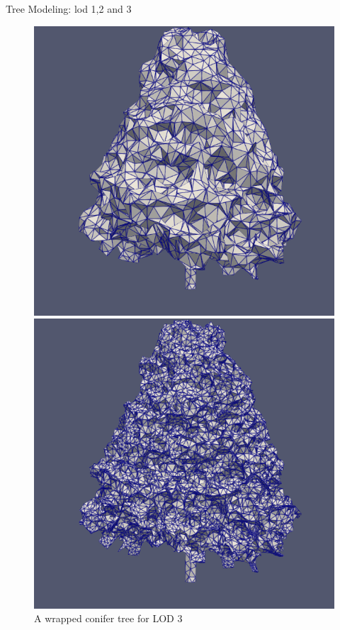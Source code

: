 \documentclass[10pt]{beamer}
\begin{document}
\begin{frame}{Tree Modeling: lod 1,2 and 3}
\begin{figure}[h]
\begin{minipage}{0.3\textwidth}
			\includegraphics[width=\textwidth]{images/tree-cone_lod2.png}
			\caption{A wrapped conifer tree for LOD 2}
			\label{fig:figure2}
		\end{minipage}
		\begin{minipage}{0.33\textwidth}
			\centering
			\includegraphics[width=\textwidth]{images/tree-cone_lod3.png}
			\caption{A wrapped conifer tree for LOD 3}
			\label{fig:figure2}
		\end{minipage}
	\end{figure}
\end{frame}
\end{document}
